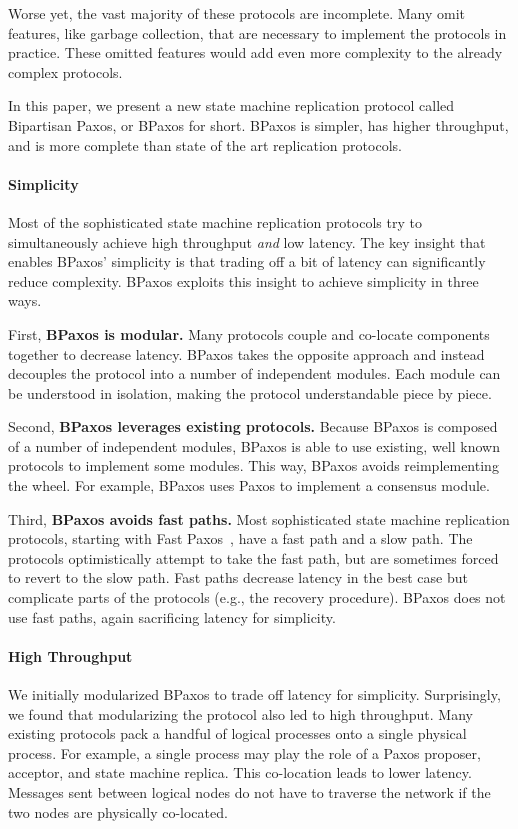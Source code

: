 Worse yet, the vast majority of these protocols are incomplete. Many omit
features, like garbage collection, that are necessary to implement the
protocols in practice. These omitted features would add even more complexity to
the already complex protocols.

In this paper, we present a new state machine replication protocol called
Bipartisan Paxos, or BPaxos for short. BPaxos is simpler, has higher
throughput, and is more complete than state of the art replication protocols.

\paragraph{Simplicity}
Most of the sophisticated state machine replication protocols try to
simultaneously achieve high throughput \emph{and} low latency. The key insight
that enables BPaxos' simplicity is that trading off a bit of latency can
significantly reduce complexity. BPaxos exploits this insight to achieve
simplicity in three ways.

First, \textbf{BPaxos is modular.} Many protocols couple and co-locate
components together to decrease latency. BPaxos takes the opposite approach and
instead decouples the protocol into a number of independent modules. Each
module can be understood in isolation, making the protocol understandable piece
by piece.

Second, \textbf{BPaxos leverages existing protocols.} Because BPaxos is
composed of a number of independent modules, BPaxos is able to use existing,
well known protocols to implement some modules. This way, BPaxos avoids
reimplementing the wheel. For example, BPaxos uses Paxos to implement a
consensus module.

Third, \textbf{BPaxos avoids fast paths.} Most sophisticated state machine
replication protocols, starting with Fast Paxos~\cite{lamport2006fast}, have a
fast path and a slow path. The protocols optimistically attempt to take the
fast path, but are sometimes forced to revert to the slow path.  Fast paths
decrease latency in the best case but complicate parts of the protocols (e.g.,
the recovery procedure). BPaxos does not use fast paths, again sacrificing
latency for simplicity.

\paragraph{High Throughput}
We initially modularized BPaxos to trade off latency for simplicity.
Surprisingly, we found that modularizing the protocol also led to high
throughput. Many existing protocols pack a handful of logical processes onto a
single physical process. For example, a single process may play the role of a
Paxos proposer, acceptor, and state machine replica. This co-location leads to
lower latency. Messages sent between logical nodes do not have to traverse the
network if the two nodes are physically co-located.

